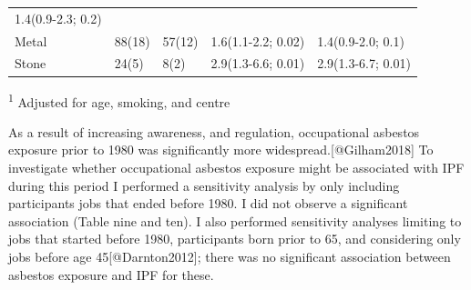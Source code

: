 \documentclass[
]{article}
\begin{document}
\begin{longtable}[]{@{}lllll@{}}
\begin{minipage}[t]{0.24\columnwidth}
1.4(0.9-2.3; 0.2)\strut
\end{minipage}\tabularnewline
\begin{minipage}[t]{0.20\columnwidth}\raggedright
Metal\strut
\end{minipage} & \begin{minipage}[t]{0.08\columnwidth}\raggedright
88(18)\strut
\end{minipage} & \begin{minipage}[t]{0.10\columnwidth}\raggedright
57(12)\strut
\end{minipage} & \begin{minipage}[t]{0.24\columnwidth}\raggedright
1.6(1.1-2.2; 0.02)\strut
\end{minipage} & \begin{minipage}[t]{0.24\columnwidth}\raggedright
1.4(0.9-2.0; 0.1)\strut
\end{minipage}\tabularnewline
\begin{minipage}[t]{0.20\columnwidth}\raggedright
Stone\strut
\end{minipage} & \begin{minipage}[t]{0.08\columnwidth}\raggedright
24(5)\strut
\end{minipage} & \begin{minipage}[t]{0.10\columnwidth}\raggedright
8(2)\strut
\end{minipage} & \begin{minipage}[t]{0.24\columnwidth}\raggedright
2.9(1.3-6.6; 0.01)\strut
\end{minipage} & \begin{minipage}[t]{0.24\columnwidth}\raggedright
2.9(1.3-6.7; 0.01)\strut
\end{minipage}\tabularnewline
\bottomrule
\end{longtable}

\textsuperscript{1} Adjusted for age, smoking, and centre

As a result of increasing awareness, and regulation, occupational
asbestos exposure prior to 1980 was significantly more
widespread.{[}@Gilham2018{]} To investigate whether occupational
asbestos exposure might be associated with IPF during this period I
performed a sensitivity analysis by only including participants jobs
that ended before 1980. I did not observe a significant association
(Table nine and ten). I also performed sensitivity analyses limiting to
jobs that started before 1980, participants born prior to 65, and
considering only jobs before age 45{[}@Darnton2012{]}; there was no
significant association between asbestos exposure and IPF for these.
\end{document}
